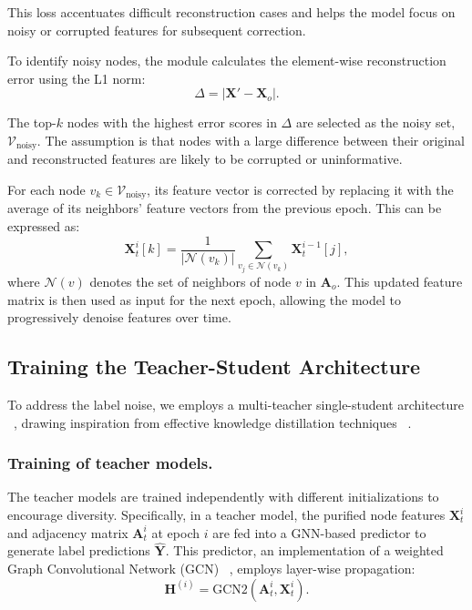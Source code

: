 \documentclass[sigconf, anonymous, review]{acmart}
\begin{document}
      This loss accentuates difficult reconstruction cases and helps the model focus on noisy or corrupted features for subsequent correction.

      To identify noisy nodes, the module calculates the element-wise reconstruction error using the L1 norm:
      \begin{equation}
        \Delta = |\mathbf{X}' - \mathbf{X}_{o}|.
      \end{equation}

      The top-$k$ nodes with the highest error scores in $\Delta$ are selected as the noisy set, $\mathcal{V}_{\text{noisy}}$.
      The assumption is that nodes with a large difference between their original and reconstructed features are likely to be corrupted or uninformative.

      For each node $v_k \in \mathcal{V}_{\text{noisy}}$, its feature vector is corrected by replacing it with the average of its neighbors' feature vectors from the previous epoch. This can be expressed as:
      \begin{equation}
        \mathbf{X}^i_t[k] = \frac{1}{|\mathcal{N}(v_k)|} \sum_{v_j \in \mathcal{N}(v_k)} \mathbf{X}^{i-1}_t[j],
      \end{equation}
      where $\mathcal{N}(v)$ denotes the set of neighbors of node $v$ in $\mathbf{A}_o$.
      This updated feature matrix is then used as input for the next epoch, allowing the model to progressively denoise features over time.

  \subsection{Training the Teacher-Student Architecture}\label{sec:teacher_student}
    To address the label noise, we employs a multi-teacher single-student architecture ~\cite{huang2021multi}, drawing inspiration from effective knowledge distillation techniques ~\cite{li2022learning}. 
    \subsubsection{Training of teacher models.}
      The teacher models are trained independently with different initializations to encourage diversity. Specifically, in a teacher model, the purified node features $\mathbf{X}_{t}^{i}$ and adjacency matrix $\mathbf{A}_{t}^{i}$ at epoch $i$ are fed into a GNN-based predictor to generate label predictions $\hat{\mathbf{Y}}$. This predictor, an implementation of a weighted Graph Convolutional Network (GCN) ~\cite{kipf2016semi}, employs layer-wise propagation:
      \begin{equation}
        \mathbf{H}^{(i)} = \text{GCN2}(\mathbf{A}_{t}^{i}, \mathbf{X}_{t}^{i}).
      \end{equation}
\end{document}
